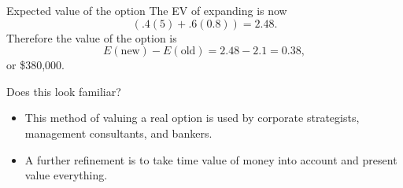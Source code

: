 \documentclass{beamer}\usepackage[]{graphicx}\usepackage[]{color}
\begin{document}
\begin{darkframes}
    \begin{frame}[fragile]{Expected value of the option}
        The EV of expanding is now
        \[ (.4(5) + .6(0.8)) = 2.48. \]
        \pause
        Therefore the value of the option is
        \[ E(\text{new}) - E(\text{old}) = 2.48 - 2.1 = 0.38, \]
        or \$380,000.
    \end{frame}


    \begin{frame}[fragile]{Does this look familiar?}
      \begin{itemize}[<+->]
        \item This method of valuing a real option is used by corporate strategists, management consultants, and bankers.
        \item A further refinement is to take time value of money into account and present value everything.
      \end{itemize}
    \end{frame}
  \end{darkframes}
\end{document}
